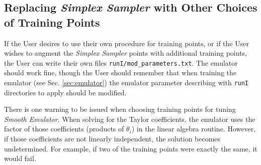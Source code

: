 \documentclass[UserManual.tex]{subfiles}
\begin{document}
\subsection{Replacing {\it Simplex Sampler} with Other Choices of Training Points}

If the User desires to use their own procedure for training points, or if the User wishes to augment the {\it Simplex Sampler} points with additional training points, the User can write their own files {\tt runI/mod\_parameters.txt}. The emulator should work fine, though the User should remember that when training the emulator (see Sec. \ref{sec:emulator}) the emulator parameter describing with {\tt runI} directories to apply should be modified.

There is one warning to be issued when choosing training points for tuning {\it Smooth Emulator}. When solving for the Taylor coefficients, the emulator uses the factor of those coefficients (products of $\theta_i$) in the linear algebra routine. However, if those coefficients are not linearly independent, the solution becomes undetermined. For example, if two of the training points were exactly the same, it would fail. 
\end{document}
